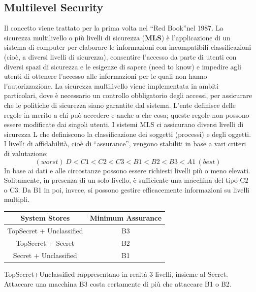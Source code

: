 \subsection{Multilevel Security}
Il concetto viene trattato per la prima volta nel “Red Book”nel 1987.
La sicurezza multilivello o più livelli di sicurezza (\textbf{MLS}) è
l'applicazione di un sistema di computer
per elaborare le informazioni con incompatibili classificazioni (cioè, a diversi
livelli di sicurezza),
consentire l'accesso da parte di utenti con diversi spazi di sicurezza e le
esigenze di sapere (need
to know) e impedire agli utenti di ottenere l'accesso alle informazioni per
le quali non hanno
l'autorizzazione.
La sicurezza multilivello viene implementata in ambiti particolari, dove è
necessario un controllo
obbligatorio degli accessi, per assicurare che le politiche di sicurezza siano
garantite dal sistema.
L'ente definisce delle regole in merito a chi può accedere e anche a che cosa;
queste regole non
possono essere modificate dai singoli utenti.
I sistemi MLS ci assicurano diversi livelli di sicurezza L che definiscono la
classificazione dei
soggetti (processi) e degli oggetti. I livelli di affidabilità, cioè di
“assurance”, vengono stabiliti in
base a vari criteri di valutazione:
\[
      (worst) \ D<C1<C2<C3<B1<B2<B3<A1 \ (best)
\]
In base ai dati e alle circostanze possono essere richiesti livelli più o meno
elevati. Solitamente, in
presenza di un solo livello, è sufficiente una macchina del tipo C2 o C3. Da B1
in poi, invece, si
possono gestire efficacemente informazioni su livelli multipli.
\begin{center}
      \begin{tabular}{ |c|c| }
            \hline
            \textbf{System Stores}   & \textbf{Minimum Assurance} \\
            \hline
            TopSecret + Unclassified & B3                         \\
            \hline
            TopSecret + Secret       & B2                         \\
            \hline
            Secret + Unclassified    & B1                         \\
            \hline
      \end{tabular}
\end{center}
TopSecret+Unclassified rappresentano in realtà 3 livelli, insieme al Secret.
Attaccare una macchina B3 costa certamente di più che attaccare B1 o B2.

